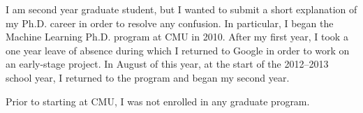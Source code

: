 \documentclass[12pt]{article}
\begin{document}
I am second year graduate student, but I wanted to submit a short explanation of my Ph.D. career in order to resolve any confusion. In particular, I began the Machine Learning Ph.D. program at CMU in 2010. After my first year, I took a one year leave of absence during which I returned to Google in order to work on an early-stage project. In August of this year, at the start of the 2012--2013 school year, I returned to the program and began my second year.

Prior to starting at CMU, I was not enrolled in any graduate program.
\end{document}
